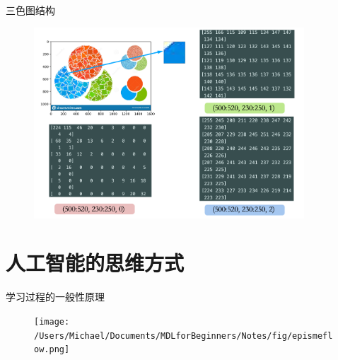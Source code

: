 \documentclass[handout]{beamer}
\begin{document}
\begin{frame}{三色图结构}
\begin{figure}[H]
	\centering
	\includegraphics[width=0.9\textwidth]{fig/rgbdecomposition}
\end{figure}
\end{frame}


\section{人工智能的思维方式}

\begin{frame}{学习过程的一般性原理}
	\begin{figure}[H]
		\centering
		\texttt{[image: /Users/Michael/Documents/MDLforBeginners/Notes/fig/epismeflow.png]}
	\end{figure}
\end{frame}
\end{document}
